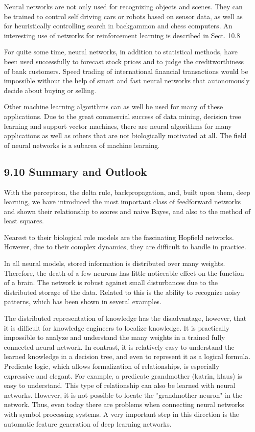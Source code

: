 \documentclass[10pt]{article}
\begin{document}
Neural networks are not only used for recognizing objects and scenes. They can be trained to control self driving cars or robots based on sensor data, as well as for heuristically controlling search in backgammon and chess computers. An interesting use of networks for reinforcement learning is described in Sect. 10.8

For quite some time, neural networks, in addition to statistical methods, have been used successfully to forecast stock prices and to judge the creditworthiness of bank customers. Speed trading of international financial transactions would be impossible without the help of smart and fast neural networks that autonomously decide about buying or selling.


Other machine learning algorithms can as well be used for many of these applications. Due to the great commercial success of data mining, decision tree learning and support vector machines, there are neural algorithms for many applications as well as others that are not biologically motivated at all. The field of neural networks is a subarea of machine learning.

\subsection*{9.10 Summary and Outlook}
With the perceptron, the delta rule, backpropagation, and, built upon them, deep learning, we have introduced the most important class of feedforward networks and shown their relationship to scores and naive Bayes, and also to the method of least squares.

Nearest to their biological role models are the fascinating Hopfield networks. However, due to their complex dynamics, they are difficult to handle in practice.

In all neural models, stored information is distributed over many weights. Therefore, the death of a few neurons has little noticeable effect on the function of a brain. The network is robust against small disturbances due to the distributed storage of the data. Related to this is the ability to recognize noisy patterns, which has been shown in several examples.

The distributed representation of knowledge has the disadvantage, however, that it is difficult for knowledge engineers to localize knowledge. It is practically impossible to analyze and understand the many weights in a trained fully connected neural network. In contrast, it is relatively easy to understand the learned knowledge in a decision tree, and even to represent it as a logical formula. Predicate logic, which allows formalization of relationships, is especially expressive and elegant. For example, a predicate grandmother (katrin, klaus) is easy to understand. This type of relationship can also be learned with neural networks. However, it is not possible to locate the "grandmother neuron" in the network. Thus, even today there are problems when connecting neural networks with symbol processing systems. A very important step in this direction is the automatic feature generation of deep learning networks.
\end{document}
